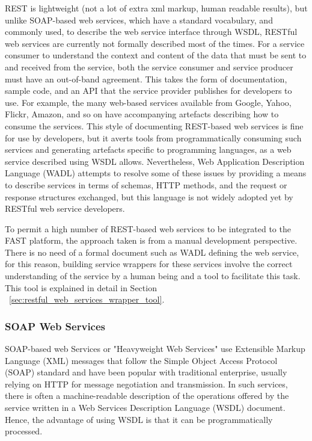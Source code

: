 \documentclass{fast_latex}
\begin{document}
REST is lightweight (not a lot of extra xml markup, human readable results), but unlike SOAP-based web services, which have a standard vocabulary, and commonly used, to describe the web service interface through WSDL, RESTful web services are currently not formally described most of the times. For a service consumer to understand the context and content of the data that must be sent to and received from the service, both the service consumer and service producer must have an out-of-band agreement. This takes the form of documentation, sample code, and an API that the service provider publishes for developers to use. For example, the many web-based services available from Google, Yahoo, Flickr, Amazon, and so on have accompanying artefacts describing how to consume the services. This style of documenting REST-based web services is fine for use by developers, but it averts tools from programmatically consuming such services and generating artefacts specific to programming languages, as a web service described using WSDL allows. Nevertheless, Web Application Description Language (WADL) attempts to resolve some of these issues by providing a means to describe services in terms of schemas, HTTP methods, and the request or response structures exchanged, but this language is not widely adopted yet by RESTful web service developers.

To permit a high number of REST-based web services to be integrated to the FAST platform, the approach taken is from a manual development perspective. There is no need of a formal document such as WADL defining the web service, for this reason, building service wrappers for these services involve the correct understanding of the service by a human being and a tool to facilitate this task. This tool is explained in detail in Section ~\ref{sec:restful_web_services_wrapper_tool}.


\subsubsection{SOAP Web Services} %
\label{ssub:soap_web_services}

SOAP-based web Services or "Heavyweight Web Services" use Extensible Markup Language (XML) \cite{XML1.1} messages that follow the Simple Object Access Protocol (SOAP) standard \cite{SOAP1.2} and have been popular with traditional enterprise, usually relying on HTTP for message negotiation and transmission. In such services, there is often a machine-readable description of the operations offered by the service written in a Web Services Description Language (WSDL) document. Hence, the advantage of using WSDL is that it can be programmatically processed. 
\end{document}
